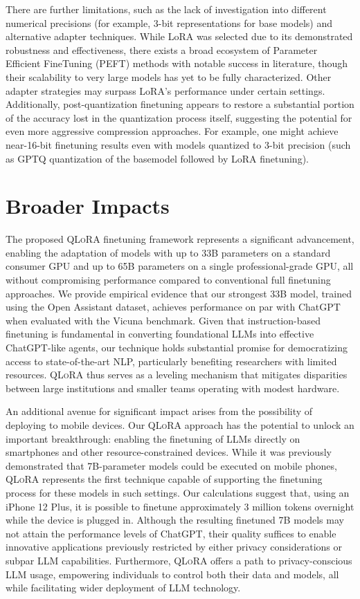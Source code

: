There are further limitations, such as the lack of investigation into different numerical precisions (for example, 3-bit representations for base models) and alternative adapter techniques. While LoRA was selected due to its demonstrated robustness and effectiveness, there exists a broad ecosystem of Parameter Efficient FineTuning (PEFT) methods with notable success in literature, though their scalability to very large models has yet to be fully characterized. Other adapter strategies may surpass LoRA’s performance under certain settings. Additionally, post-quantization finetuning appears to restore a substantial portion of the accuracy lost in the quantization process itself, suggesting the potential for even more aggressive compression approaches. For example, one might achieve near-16-bit finetuning results even with models quantized to 3-bit precision (such as GPTQ quantization of the basemodel followed by LoRA finetuning).

\section{Broader Impacts}

The proposed \textsc{QLoRA} finetuning framework represents a significant advancement, enabling the adaptation of models with up to 33B parameters on a standard consumer GPU and up to 65B parameters on a single professional-grade GPU, all without compromising performance compared to conventional full finetuning approaches. We provide empirical evidence that our strongest 33B model, trained using the Open Assistant dataset, achieves performance on par with ChatGPT when evaluated with the Vicuna benchmark. Given that instruction-based finetuning is fundamental in converting foundational LLMs into effective ChatGPT-like agents, our technique holds substantial promise for democratizing access to state-of-the-art NLP, particularly benefiting researchers with limited resources. \textsc{QLoRA} thus serves as a leveling mechanism that mitigates disparities between large institutions and smaller teams operating with modest hardware.

An additional avenue for significant impact arises from the possibility of deploying to mobile devices. Our \textsc{QLoRA} approach has the potential to unlock an important breakthrough: enabling the finetuning of LLMs directly on smartphones and other resource-constrained devices. While it was previously demonstrated that 7B-parameter models could be executed on mobile phones, \textsc{QLoRA} represents the first technique capable of supporting the finetuning process for these models in such settings. Our calculations suggest that, using an iPhone 12 Plus, it is possible to finetune approximately 3 million tokens overnight while the device is plugged in. Although the resulting finetuned 7B models may not attain the performance levels of ChatGPT, their quality suffices to enable innovative applications previously restricted by either privacy considerations or subpar LLM capabilities. Furthermore, \textsc{QLoRA} offers a path to privacy-conscious LLM usage, empowering individuals to control both their data and models, all while facilitating wider deployment of LLM technology.

